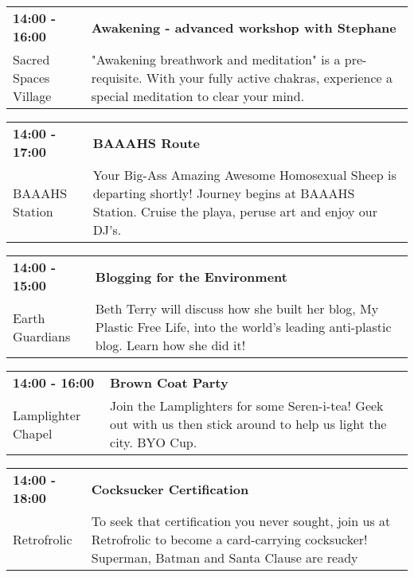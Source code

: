 \begin{tabular}{ p{1in} p{2.2in} }
    \textbf{14:00 - 16:00} & \textbf{Awakening - advanced workshop with Stephane} \\
    Sacred Spaces Village \newline  & "Awakening breathwork and meditation" is a pre-requisite. With your fully active chakras, experience a special meditation to clear your mind. \\
    \hline 
\end{tabular}
    
\begin{tabular}{ p{1in} p{2.2in} }
    \textbf{14:00 - 17:00} & \textbf{BAAAHS Route} \\
    BAAAHS Station \newline  & Your Big-Ass Amazing Awesome Homosexual Sheep is departing shortly! Journey begins at BAAAHS Station. Cruise the playa, peruse art and enjoy our DJ's. \\
    \hline 
\end{tabular}
    
\begin{tabular}{ p{1in} p{2.2in} }
    \textbf{14:00 - 15:00} & \textbf{Blogging for the Environment } \\
    Earth Guardians \newline  & Beth Terry will discuss how she built her blog, My Plastic Free Life, into the world's leading anti-plastic blog. Learn how she did it! \\
    \hline 
\end{tabular}
    
\begin{tabular}{ p{1in} p{2.2in} }
    \textbf{14:00 - 16:00} & \textbf{Brown Coat Party} \\
    Lamplighter Chapel \newline  & Join the Lamplighters for some Seren-i-tea! Geek out with us then stick around to help us light the city. BYO Cup. \\
    \hline 
\end{tabular}
    
\begin{tabular}{ p{1in} p{2.2in} }
    \textbf{14:00 - 18:00} & \textbf{Cocksucker Certification} \\
    Retrofrolic \newline  & To seek that certification you never sought, join us at Retrofrolic to become a card-carrying cocksucker!  Superman, Batman and Santa Clause are ready \\
    \hline 
\end{tabular}
    
